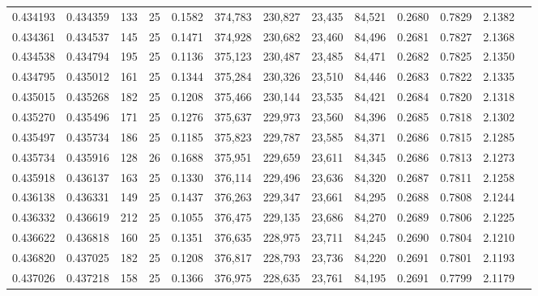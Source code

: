 \begin{tabular}{rrrrrrrrrrrrr}
0.434193 & 0.434359 &   133 &  25 &                                     0.1582 & 374,783 & 230,827 &  23,435 &  84,521 & 0.2680 & 0.7829 & 2.1382 \\
0.434361 & 0.434537 &   145 &  25 &                                     0.1471 & 374,928 & 230,682 &  23,460 &  84,496 & 0.2681 & 0.7827 & 2.1368 \\
0.434538 & 0.434794 &   195 &  25 &                                     0.1136 & 375,123 & 230,487 &  23,485 &  84,471 & 0.2682 & 0.7825 & 2.1350 \\
0.434795 & 0.435012 &   161 &  25 &                                     0.1344 & 375,284 & 230,326 &  23,510 &  84,446 & 0.2683 & 0.7822 & 2.1335 \\
0.435015 & 0.435268 &   182 &  25 &                                     0.1208 & 375,466 & 230,144 &  23,535 &  84,421 & 0.2684 & 0.7820 & 2.1318 \\
0.435270 & 0.435496 &   171 &  25 &                                     0.1276 & 375,637 & 229,973 &  23,560 &  84,396 & 0.2685 & 0.7818 & 2.1302 \\
0.435497 & 0.435734 &   186 &  25 &                                     0.1185 & 375,823 & 229,787 &  23,585 &  84,371 & 0.2686 & 0.7815 & 2.1285 \\
0.435734 & 0.435916 &   128 &  26 &                                     0.1688 & 375,951 & 229,659 &  23,611 &  84,345 & 0.2686 & 0.7813 & 2.1273 \\
0.435918 & 0.436137 &   163 &  25 &                                     0.1330 & 376,114 & 229,496 &  23,636 &  84,320 & 0.2687 & 0.7811 & 2.1258 \\
0.436138 & 0.436331 &   149 &  25 &                                     0.1437 & 376,263 & 229,347 &  23,661 &  84,295 & 0.2688 & 0.7808 & 2.1244 \\
0.436332 & 0.436619 &   212 &  25 &                                     0.1055 & 376,475 & 229,135 &  23,686 &  84,270 & 0.2689 & 0.7806 & 2.1225 \\
0.436622 & 0.436818 &   160 &  25 &                                     0.1351 & 376,635 & 228,975 &  23,711 &  84,245 & 0.2690 & 0.7804 & 2.1210 \\
0.436820 & 0.437025 &   182 &  25 &                                     0.1208 & 376,817 & 228,793 &  23,736 &  84,220 & 0.2691 & 0.7801 & 2.1193 \\
0.437026 & 0.437218 &   158 &  25 &                                     0.1366 & 376,975 & 228,635 &  23,761 &  84,195 & 0.2691 & 0.7799 & 2.1179 \\

\end{tabular}
